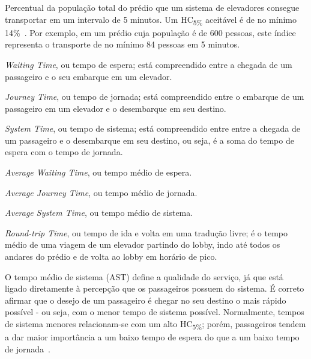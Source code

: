 \begin{description}[leftmargin=!,labelwidth=\widthof{\bfseries HC\textsubscript{5\%}}]
  \item[HC\textsubscript{5\%}]
  Percentual da população total do prédio que um sistema de elevadores consegue transportar em um intervalo de 5 minutos. Um HC\textsubscript{5\%} aceitável é de no mínimo 14\%~\cite{KOEHLEROTTIGER02}. Por exemplo, em um prédio cuja população é de 600 pessoas, este índice representa o transporte de no mínimo 84 pessoas em 5 minutos.

  \item[WT]
  \textit{Waiting Time}, ou tempo de espera; está compreendido entre a chegada de um passageiro e o seu embarque em um elevador.

  \item[JT]
  \textit{Journey Time}, ou tempo de jornada; está compreendido entre o embarque de um passageiro em um elevador e o desembarque em seu destino.

  \item[ST]
  \textit{System Time}, ou tempo de sistema; está compreendido entre entre a chegada de um passageiro e o desembarque em seu destino, ou seja, é a soma do tempo de espera com o tempo de jornada.

  \item[AWT]
  \textit{Average Waiting Time}, ou tempo médio de espera.

  \item[AJT]
  \textit{Average Journey Time}, ou tempo médio de jornada.

  \item[AST]
  \textit{Average System Time}, ou tempo médio de sistema.

  \item[RTT]
  \textit{Round-trip Time}, ou tempo de ida e volta em uma tradução livre; é o tempo médio de uma viagem de um elevador partindo do lobby, indo até todos os andares do prédio e de volta ao lobby em horário de pico.
\end{description}

O tempo médio de sistema (AST) define a qualidade do serviço, já que está ligado diretamente à percepção que os passageiros possuem do sistema. É correto afirmar que o desejo de um passageiro é chegar no seu destino o mais rápido possível - ou seja, com o menor tempo de sistema possível. Normalmente, tempos de sistema menores relacionam-se com um alto HC\textsubscript{5\%}; porém, passageiros tendem a dar maior importância a um baixo tempo de espera do que a um baixo tempo de jornada~\cite{KOEHLEROTTIGER02}.

